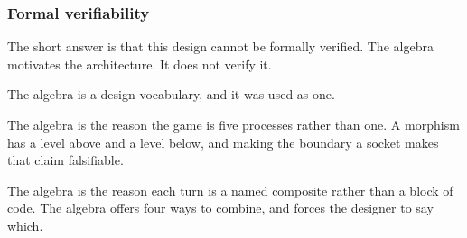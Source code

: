 \documentclass[aspectratio=169,12pt]{beamer}
\begin{document}
\begin{frame}
\frametitle{Formal verifiability}
\vfill
\begin{center}
\begin{minipage}{0.92\textwidth}
\raggedright

The short answer is that this design cannot be formally verified. The algebra motivates the
architecture. It does not verify it.

\medskip

The algebra is a design vocabulary, and it was used as one.

\medskip

The algebra is the reason the game is five processes rather than one. A morphism has a level
above and a level below, and making the boundary a socket makes that claim falsifiable.

\medskip

The algebra is the reason each turn is a named composite rather than a block of code. The
algebra offers four ways to combine, and forces the designer to say which.

\end{minipage}
\end{center}
\vfill
\end{frame}
\end{document}
